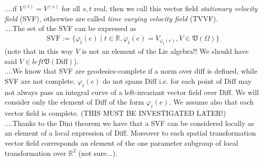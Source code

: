 ....if $V^{(t)} = V^{(s)}$ for all $s,t$ real, then we call this vector field \emph{stationary velocity field} (SVF), otherwise are called \emph{time varying velocity field} (TVVF).\\
....The set of the SVF can be expressed as
\begin{align*}
\text{SVF} := \lbrace \varphi_{t}(e) \mid t \in \mathbb{R}, \dot{\varphi}_{t}(e) = V_{\varphi_{t}(e)},  V \in \mathfrak{V}(\Omega) \rbrace
\end{align*}
(note that in this way $V$ is not an element of the Lie algebra!! We should have said $V \in left\mathfrak{V}(\text{Diff})$).\\
....We know that SVF are geodesics-complete if a norm over $\text{diff}$ is defined, while SVF are not complete. $\varphi_{t}(e)$ do not spans $\text{Diff}$ i.e. for each point of $\text{Diff}$ may not always pass an integral curve of a left-invariant vector field over $\text{Diff}$. We will consider only the element of $\text{Diff}$ of the form $\varphi_{t}(e)$. We assume also that each vector field is complete. (THIS MUST BE INVESTIGATED LATER!)\\
....Thanks to the Dini theorem we have that a SVF can be considered locally as an element of a local expression of $\text{Diff}$.
Moreover to each spatial transformation vector field corresponds an element of the one parameter subgroup of local transformation over $\mathbb{R}^2$ (not sure...).\\




